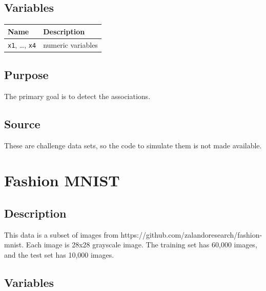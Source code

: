 \documentclass[
  letterpaper,
]{krantz}
\begin{document}
\subsection*{Variables}\label{variables-11}

\begin{longtable}[]{@{}ll@{}}
\toprule\noalign{}
Name & Description \\
\midrule\noalign{}
\endhead
\bottomrule\noalign{}
\endlastfoot
\texttt{x1}, \ldots, \texttt{x4} & numeric variables \\
\end{longtable}

\subsection*{Purpose}\label{purpose-11}

The primary goal is to detect the associations.

\subsection*{Source}\label{source-11}

These are challenge data sets, so the code to simulate them is not made
available.

\section{Fashion MNIST}\label{fashion-mnist}

\subsection*{Description}\label{description-12}

This data is a subset of images from
https://github.com/zalandoresearch/fashion-mnist. Each image is 28x28
grayscale image. The training set has 60,000 images, and the test set
has 10,000 images.

\subsection*{Variables}\label{variables-12}
\end{document}
